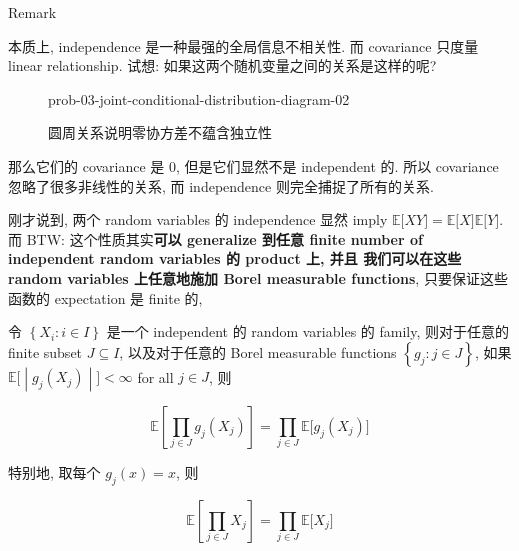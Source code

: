 \begin{qlremark}{Remark}

本质上, independence 是一种最强的全局信息不相关性. 而 covariance 只度量 linear relationship. 试想: 如果这两个随机变量之间的关系是这样的呢?

\begin{figure}[htbp]
\centering
\begin{qldrawing}
\csname prob-03-joint-conditional-distribution-diagram-02\endcsname
\end{qldrawing}

\caption{圆周关系说明零协方差不蕴含独立性}

\label{fig-prob-03-joint-conditional-distribution-diagram-02}

\end{figure}

那么它们的 covariance 是 0, 但是它们显然不是 independent 的. 所以 covariance 忽略了很多非线性的关系, 而 independence 则完全捕捉了所有的关系.\\

\end{qlremark}

刚才说到, 两个 random variables 的 independence 显然 imply \(\mathbb{E}\lbrack\mathit{X}\mathit{Y}\rbrack = \mathbb{E}\lbrack\mathit{X}\rbrack\mathbb{E}\lbrack\mathit{Y}\rbrack\). 而 BTW: 这个性质其实\textbf{可以 generalize 到任意 finite number of independent random variables 的 product 上, 并且 我们可以在这些 random variables 上任意地施加 Borel measurable functions}, 只要保证这些函数的 expectation 是 finite 的,

\begin{theorem}{}

令 \(\left\{ {\mathit{X}_{\mathit{i}}:\mathit{i} \in \mathit{I}} \right\}\) 是一个 independent 的 random variables 的 family, 则对于任意的 finite subset \(\mathit{J} \subseteq \mathit{I}\), 以及对于任意的 Borel measurable functions \(\left\{ {\mathit{g}_{\mathit{j}}:\mathit{j} \in \mathit{J}} \right\}\), 如果 \(\left. \mathbb{E}\lbrack \middle| \mathit{g}_{\mathit{j}}(\mathit{X}_{\mathit{j}}) \middle| \rbrack < \infty \right.\) for all \(\mathit{j} \in \mathit{J}\), 则

\[\mathbb{E}\left\lbrack {\prod\limits_{\mathit{j} \in \mathit{J}}\mathit{g}_{\mathit{j}}(\mathit{X}_{\mathit{j}})} \right\rbrack = \prod\limits_{\mathit{j} \in \mathit{J}}\mathbb{E}\lbrack\mathit{g}_{\mathit{j}}(\mathit{X}_{\mathit{j}})\rbrack\]

特别地, 取每个 \(\mathit{g}_{\mathit{j}}(\mathit{x}) = \mathit{x}\), 则

\[\mathbb{E}\left\lbrack {\prod\limits_{\mathit{j} \in \mathit{J}}\mathit{X}_{\mathit{j}}} \right\rbrack = \prod\limits_{\mathit{j} \in \mathit{J}}\mathbb{E}\lbrack\mathit{X}_{\mathit{j}}\rbrack\]

\end{theorem}

